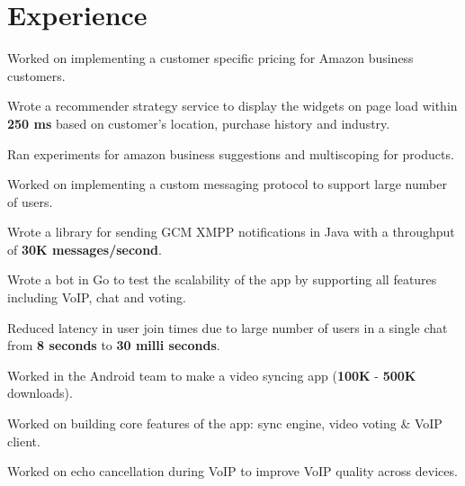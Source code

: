\documentclass[]{deedy-resume-openfont}
\begin{document}
\begin{minipage}[t]{0.66\textwidth} 


\section{Experience}
\vspace{\topsep} %
\begin{tightemize}
	\item Worked on implementing a customer specific pricing for Amazon business customers.
	\item Wrote a recommender strategy service to display the widgets on page load within \textcolor{boldcolor}{\textbf{250 ms}} based on customer's location, purchase history and industry.
	\item Ran experiments for amazon business suggestions and multiscoping for products.
\end{tightemize}
\sectionsep


\vspace{\topsep} %
\begin{tightemize}
\item Worked on implementing a custom messaging protocol to support large number of users.
\item Wrote a library for sending GCM XMPP notifications in Java with a throughput of \textcolor{boldcolor}{\textbf{30K messages/second}}.
\item Wrote a bot in Go to test the scalability of the app by supporting all features including VoIP, chat and voting.
\item Reduced latency in user join times due to large number of users in a single chat from \textcolor{boldcolor}{\textbf{8 seconds}} to \textcolor{boldcolor}{\textbf{30 milli seconds}}.
\end{tightemize}
\sectionsep

\begin{tightemize}
\item Worked in the Android team to make a video syncing app (\textcolor{boldcolor}{\textbf{100K}} - \textcolor{boldcolor}{\textbf{500K}} downloads).
\item Worked on building core features of the app: sync engine, video voting \& VoIP client.
\item Worked on echo cancellation during VoIP to improve VoIP quality across devices.
\end{tightemize}
\sectionsep


\end{minipage}
\end{document}
